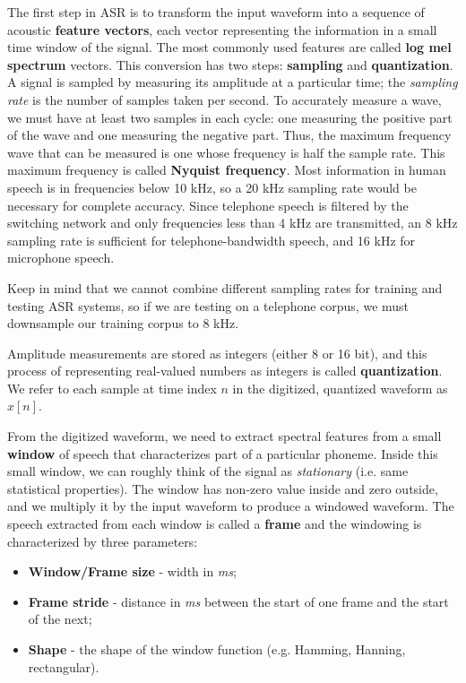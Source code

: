 The first step in ASR is to transform the input waveform into a sequence of acoustic \textbf{feature vectors}, each vector representing the information in a small time window of the signal. The most commonly used features are called \textbf{log mel spectrum} vectors. This conversion has two steps: \textbf{sampling} and \textbf{quantization}. 
A signal is sampled by measuring its amplitude at a particular time; the \textit{sampling rate} is the number of samples taken per second. To accurately measure a wave, we must have at least two samples in each cycle: one measuring the positive part of the wave and one measuring the negative part. Thus, the maximum frequency wave that can be measured is one whose frequency is half the sample rate. This maximum frequency is called \textbf{Nyquist frequency}.
Most information in human speech is in frequencies below 10 kHz, so a 20 kHz sampling rate would be necessary for complete accuracy. Since telephone speech is filtered by the switching network and only frequencies less than 4 kHz are transmitted, an 8 kHz sampling rate is sufficient for telephone-bandwidth speech, and 16 kHz for microphone speech. 

\begin{observationblock}
    Keep in mind that we cannot combine different sampling rates for training and testing ASR systems, so if we are testing on a telephone corpus, we must downsample our training corpus to 8 kHz.
\end{observationblock}

Amplitude measurements are stored as integers (either 8 or 16 bit), and this process of representing real-valued numbers as integers is called \textbf{quantization}. We refer to each sample at time index $n$ in the digitized, quantized waveform as $x[n]$.

From the digitized waveform, we need to extract spectral features from a small \textbf{window} of speech that characterizes part of a particular phoneme. Inside this small window, we can roughly think of the signal as \textit{stationary} (i.e. same statistical properties). The window has non-zero value inside and zero outside, and we multiply it by the input waveform to produce a windowed waveform. 
The speech extracted from each window is called a \textbf{frame} and the windowing is characterized by three parameters: 
\begin{itemize}
    \item \textbf{Window/Frame size} - width in \textit{ms};
    \item \textbf{Frame stride} - distance in \textit{ms} between the start of one frame and the start of the next;
    \item \textbf{Shape} - the shape of the window function (e.g. Hamming, Hanning, rectangular).
\end{itemize}

